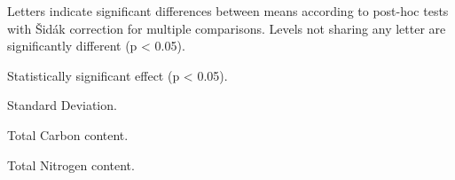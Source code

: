 \begin{table}[htbp]
\begin{threeparttable}
      \begin{tablenotes}
        \item[a] Letters indicate significant differences between means according to post-hoc tests with Šidák correction for multiple comparisons. Levels not sharing any letter are significantly different (p < 0.05).
        \item[*] Statistically significant effect (p < 0.05).
        \item[SD] Standard Deviation.
        \item[C\textsubscript{T}] Total Carbon content.
        \item[N\textsubscript{T}] Total Nitrogen content.
      \end{tablenotes}
    \end{threeparttable}
  \end{table}
  
 

